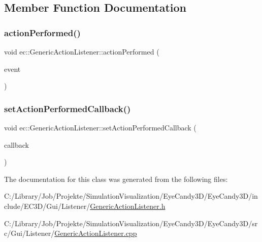 \subsection{Member Function Documentation}
\mbox{\label{classec_1_1_generic_action_listener_a559a752b60543f5deabfccb2eb6efaf8}} 
\subsubsection{\texorpdfstring{action\+Performed()}{actionPerformed()}}
{\footnotesize\ttfamily void ec\+::\+Generic\+Action\+Listener\+::action\+Performed (\begin{DoxyParamCaption}\item[{const agui\+::\+Action\+Event \&}]{event }\end{DoxyParamCaption})\hspace{0.3cm}{\ttfamily [override]}}

\mbox{\label{classec_1_1_generic_action_listener_ae824ead75dce8eae0910da7432e3c400}} 
\subsubsection{\texorpdfstring{set\+Action\+Performed\+Callback()}{setActionPerformedCallback()}}
{\footnotesize\ttfamily void ec\+::\+Generic\+Action\+Listener\+::set\+Action\+Performed\+Callback (\begin{DoxyParamCaption}\item[{const \mbox{\hyperlink{classec_1_1_generic_action_listener_ab58c5e9b4caf14e4d1b1e50ffff5e628}{Action\+Performed\+\_\+\+Callback}} \&}]{callback }\end{DoxyParamCaption})}



The documentation for this class was generated from the following files\+:\begin{DoxyCompactItemize}
\item 
C\+:/\+Library/\+Job/\+Projekte/\+Simulation\+Visualization/\+Eye\+Candy3\+D/\+Eye\+Candy3\+D/include/\+E\+C3\+D/\+Gui/\+Listener/\mbox{\hyperlink{_generic_action_listener_8h}{Generic\+Action\+Listener.\+h}}\item 
C\+:/\+Library/\+Job/\+Projekte/\+Simulation\+Visualization/\+Eye\+Candy3\+D/\+Eye\+Candy3\+D/src/\+Gui/\+Listener/\mbox{\hyperlink{_generic_action_listener_8cpp}{Generic\+Action\+Listener.\+cpp}}\end{DoxyCompactItemize}
